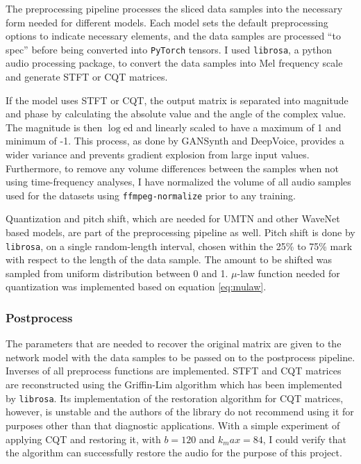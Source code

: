 \documentclass[12pt,a4paper,]{report}
\begin{document}
The preprocessing pipeline processes the sliced data samples into the
necessary form needed for different models. Each model sets the default
preprocessing options to indicate necessary elements, and the data
samples are processed ``to spec'' before being converted into
\texttt{PyTorch} tensors. I used \texttt{librosa}, a python audio
processing package, to convert the data samples into Mel frequency scale
and generate STFT or CQT matrices.

If the model uses STFT or CQT, the output matrix is separated into
magnitude and phase by calculating the absolute value and the angle of
the complex value. The magnitude is then \(\log\)ed and linearly scaled
to have a maximum of 1 and minimum of -1. This process, as done by
GANSynth and DeepVoice, provides a wider variance and prevents gradient
explosion from large input values. Furthermore, to remove any volume
differences between the samples when not using time-frequency analyses,
I have normalized the volume of all audio samples used for the datasets
using \texttt{ffmpeg-normalize} prior to any training.

Quantization and pitch shift, which are needed for UMTN and other
WaveNet based models, are part of the preprocessing pipeline as well.
Pitch shift is done by \texttt{librosa}, on a single random-length
interval, chosen within the 25\% to 75\% mark with respect to the length
of the data sample. The amount to be shifted was sampled from uniform
distribution between 0 and 1. \(\mu\)-law function needed for
quantization was implemented based on equation \ref{eq:mulaw}.

\hypertarget{postprocess}{%
\subsubsection{Postprocess}\label{postprocess}}

The parameters that are needed to recover the original matrix are given
to the network model with the data samples to be passed on to the
postprocess pipeline. Inverses of all preprocess functions are
implemented. STFT and CQT matrices are reconstructed using the
Griffin-Lim algorithm which has been implemented by \texttt{librosa}.
Its implementation of the restoration algorithm for CQT matrices,
however, is unstable and the authors of the library do not recommend
using it for purposes other than that diagnostic applications. With a
simple experiment of applying CQT and restoring it, with \(b = 120\) and
\(k_max = 84\), I could verify that the algorithm can successfully
restore the audio for the purpose of this project.
\end{document}
